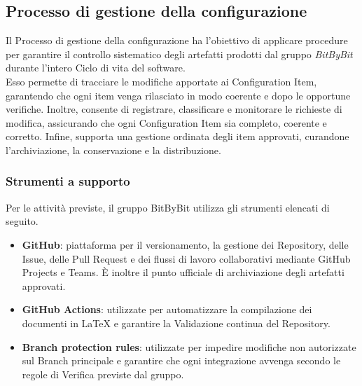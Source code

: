 \documentclass[a4paper,12pt]{article}
\begin{document}
\subsection{Processo di gestione della configurazione}
Il Processo di gestione della configurazione ha l’obiettivo di applicare procedure per garantire il controllo sistematico degli artefatti prodotti dal gruppo \textit{BitByBit} durante l’intero Ciclo di vita del software. \\
Esso permette di tracciare le modifiche apportate ai Configuration Item, garantendo che ogni item venga rilasciato in modo coerente e dopo le opportune verifiche. Inoltre, consente di registrare, classificare e monitorare le richieste di modifica, assicurando che ogni Configuration Item sia completo, coerente e corretto. 
Infine, supporta una gestione ordinata degli item approvati, curandone l’archiviazione, la conservazione e la distribuzione.

\subsubsection{Strumenti a supporto}
Per le attività previste, il gruppo BitByBit utilizza gli strumenti elencati di seguito.
\begin{itemize}
    \item \textbf{GitHub}: piattaforma per il versionamento, la gestione dei Repository, delle Issue, delle Pull Request e dei flussi di lavoro collaborativi mediante GitHub Projects e Teams. È inoltre il punto ufficiale di archiviazione degli artefatti approvati.
    \item \textbf{GitHub Actions}: utilizzate per automatizzare la compilazione dei documenti in \LaTeX{} e garantire la Validazione continua del Repository.
    \item \textbf{Branch protection rules}: utilizzate per impedire modifiche non autorizzate sul Branch principale e garantire che ogni integrazione avvenga secondo le regole di Verifica previste dal gruppo.
\end{itemize}
\end{document}
